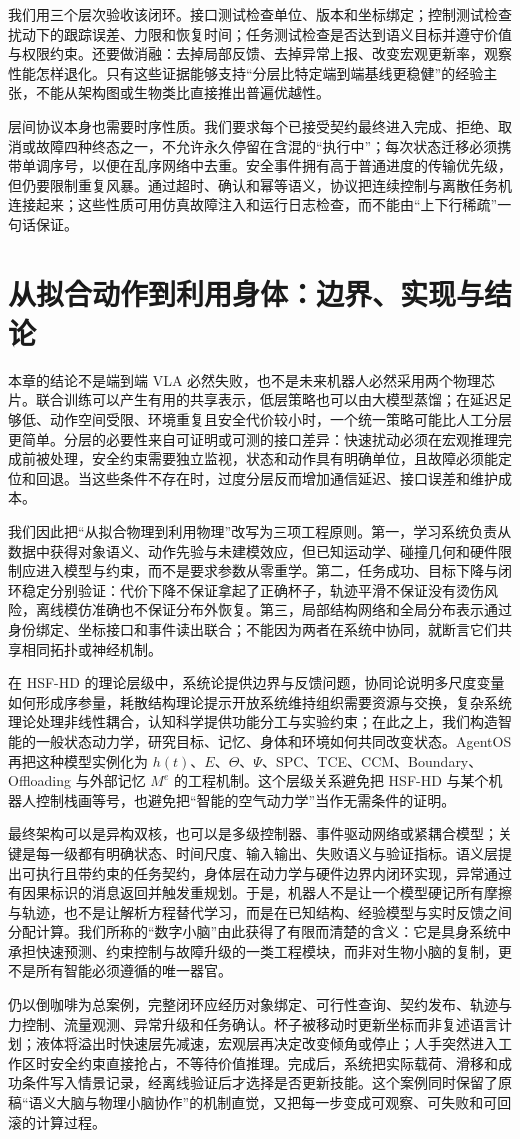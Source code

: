 我们用三个层次验收该闭环。接口测试检查单位、版本和坐标绑定；控制测试检查扰动下的跟踪误差、力限和恢复时间；任务测试检查是否达到语义目标并遵守价值与权限约束。还要做消融：去掉局部反馈、去掉异常上报、改变宏观更新率，观察性能怎样退化。只有这些证据能够支持“分层比特定端到端基线更稳健”的经验主张，不能从架构图或生物类比直接推出普遍优越性。

层间协议本身也需要时序性质。我们要求每个已接受契约最终进入完成、拒绝、取消或故障四种终态之一，不允许永久停留在含混的“执行中”；每次状态迁移必须携带单调序号，以便在乱序网络中去重。安全事件拥有高于普通进度的传输优先级，但仍要限制重复风暴。通过超时、确认和幂等语义，协议把连续控制与离散任务机连接起来；这些性质可用仿真故障注入和运行日志检查，而不能由“上下行稀疏”一句话保证。

\section{从拟合动作到利用身体：边界、实现与结论}
\label{sec:from_fitting_to_utilizing}

本章的结论不是端到端 VLA 必然失败，也不是未来机器人必然采用两个物理芯片。联合训练可以产生有用的共享表示，低层策略也可以由大模型蒸馏；在延迟足够低、动作空间受限、环境重复且安全代价较小时，一个统一策略可能比人工分层更简单。分层的必要性来自可证明或可测的接口差异：快速扰动必须在宏观推理完成前被处理，安全约束需要独立监视，状态和动作具有明确单位，且故障必须能定位和回退。当这些条件不存在时，过度分层反而增加通信延迟、接口误差和维护成本。

我们因此把“从拟合物理到利用物理”改写为三项工程原则。第一，学习系统负责从数据中获得对象语义、动作先验与未建模效应，但已知运动学、碰撞几何和硬件限制应进入模型与约束，而不是要求参数从零重学。第二，任务成功、目标下降与闭环稳定分别验证：代价下降不保证拿起了正确杯子，轨迹平滑不保证没有烫伤风险，离线模仿准确也不保证分布外恢复。第三，局部结构网络和全局分布表示通过身份绑定、坐标接口和事件读出联合；不能因为两者在系统中协同，就断言它们共享相同拓扑或神经机制。

在 HSF-HD 的理论层级中，系统论提供边界与反馈问题，协同论说明多尺度变量如何形成序参量，耗散结构理论提示开放系统维持组织需要资源与交换，复杂系统理论处理非线性耦合，认知科学提供功能分工与实验约束；在此之上，我们构造智能的一般状态动力学，研究目标、记忆、身体和环境如何共同改变状态。AgentOS 再把这种模型实例化为 $h(t)$、$E$、$\Theta$、$\Psi$、SPC、TCE、CCM、Boundary、Offloading 与外部记忆 $M^e$ 的工程机制。这个层级关系避免把 HSF-HD 与某个机器人控制栈画等号，也避免把“智能的空气动力学”当作无需条件的证明。

最终架构可以是异构双核，也可以是多级控制器、事件驱动网络或紧耦合模型；关键是每一级都有明确状态、时间尺度、输入输出、失败语义与验证指标。语义层提出可执行且带约束的任务契约，身体层在动力学与硬件边界内闭环实现，异常通过有因果标识的消息返回并触发重规划。于是，机器人不是让一个模型硬记所有摩擦与轨迹，也不是让解析方程替代学习，而是在已知结构、经验模型与实时反馈之间分配计算。我们所称的“数字小脑”由此获得了有限而清楚的含义：它是具身系统中承担快速预测、约束控制与故障升级的一类工程模块，而非对生物小脑的复制，更不是所有智能必须遵循的唯一器官。

仍以倒咖啡为总案例，完整闭环应经历对象绑定、可行性查询、契约发布、轨迹与力控制、流量观测、异常升级和任务确认。杯子被移动时更新坐标而非复述语言计划；液体将溢出时快速层先减速，宏观层再决定改变倾角或停止；人手突然进入工作区时安全约束直接抢占，不等待价值推理。完成后，系统把实际载荷、滑移和成功条件写入情景记录，经离线验证后才选择是否更新技能。这个案例同时保留了原稿“语义大脑与物理小脑协作”的机制直觉，又把每一步变成可观察、可失败和可回滚的计算过程。

